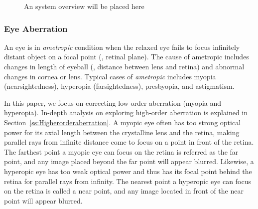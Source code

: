 \begin{figure*}
    \begin{center}
        \fbox{\rule{0pt}{2in} \rule{.9\linewidth}{0pt}}
    \end{center}
    \caption{An system overview will be placed here}
    \label{fig:fig1}
\end{figure*}

\subsubsection{Eye Aberration}
An eye is in \textit{ametropic} condition when the relaxed eye fails to focus infinitely distant object on a focal point (\eg, retinal plane). The cause of ametropic includes changes in length of eyeball (\ie, distance between lens and retina) and abnormal changes in cornea or lens. Typical cases of \textit{ametropic} includes myopia (nearsightedness), hyperopia (farsightedness), presbyopia, and astigmatism.

In this paper, we focus on correcting low-order aberration (myopia and hyperopia). In-depth analysis on exploring high-order aberration is explained in Section~\ref{ss:Higherorderaberration}. A myopic eye often has too strong optical power for its axial length between the crystalline lens and the retina, making parallel rays from infinite distance come to focus on a point in front of the retina. The farthest point a myopic eye can focus on the retina is referred as the far point, and any image placed beyond the far point will appear blurred. Likewise, a hyperopic eye has too weak optical power and thus has its focal point behind the retina for parallel rays from infinity. The nearest point a hyperopic eye can focus on the retina is called a near point, and any image located in front of the near point will appear blurred.

